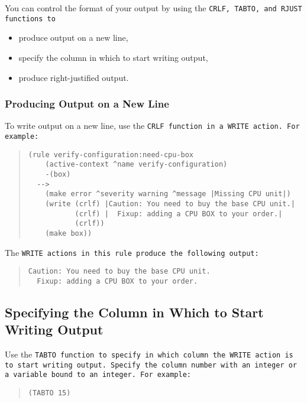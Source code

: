 You can control the format of your output by using the \tt{CRLF},
\tt{TABTO}, and \tt{RJUST} functions to

\begin{itemize}
\item produce output on a new line,
\item specify the column in which to start writing output,
\item produce right-justified output.
\end{itemize}

\subsubsection{Producing Output on a New Line}

To write output on a new line, use the \tt{CRLF} function in a
\tt{WRITE} action. For example:

\begin{quote}
\begin{verbatim}
(rule verify-configuration:need-cpu-box
    (active-context ^name verify-configuration)
    -(box)
  -->
    (make error ^severity warning ^message |Missing CPU unit|)
    (write (crlf) |Caution: You need to buy the base CPU unit.|
           (crlf) |  Fixup: adding a CPU BOX to your order.|
           (crlf))
    (make box))
\end{verbatim}
\end{quote}

The \tt{WRITE} actions in this rule produce the following output:

\begin{quote}
\begin{verbatim}
Caution: You need to buy the base CPU unit.
  Fixup: adding a CPU BOX to your order.
\end{verbatim}
\end{quote}

\subsection{Specifying the Column in Which to Start Writing Output}

Use the \tt{TABTO} function to specify in which column the \tt{WRITE}
action is to start writing output. Specify the column number with an
integer or a variable bound to an integer. For example:

\begin{quote}
\begin{verbatim}
(TABTO 15)
\end{verbatim}
\end{quote}

